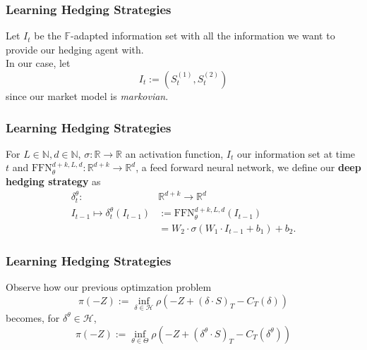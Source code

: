 \documentclass[serif]{beamer}
\def\R{{\mathbb R}}
\def\N{{\mathbb N}}
\def\F{{\mathbb F}}
\def\vs{{\vspace{0.5cm}}}
\def\H{{\mathcal H}}
\begin{document}
\begin{frame}
    \frametitle{Learning Hedging Strategies}
    \begin{definition}
        Let $I_t$ be the $\F$-adapted information
        set with all the information we want to provide our
        hedging agent with. \\ \vs
        In our case, let
        \[
            I_t := (S^{(1)}_t, S^{(2)}_t)
        \]
        since our market model is \emph{markovian}.
    \end{definition}
\end{frame}

\begin{frame}
    \frametitle{Learning Hedging Strategies}
    \begin{definition}
        For $L \in \N, d \in \N$, $\sigma: \R \to \R$
        an activation function,
        $I_t$ our information set at time $t$ and
        $\text{FFN}_\theta^{d+k, L, d} : \R^{d+k} \to \R^d$,
        a feed forward neural network, we define
        our \textbf{deep hedging strategy} as
        \begin{align*}
            \delta^\theta_t:
            \;\; & \R^{d+k} \to \R^d                                   \\
            I_{t-1} \mapsto \delta^\theta_t (I_{t-1})
                 & := \text{FFN}_\theta^{d+k, L, d} (I_{t-1})          \\
                 & = W_2 \cdot \sigma (W_1 \cdot I_{t-1} + b_1) + b_2.
        \end{align*}
    \end{definition}
\end{frame}

\begin{frame}
    \frametitle{Learning Hedging Strategies}
    Observe how our previous optimzation problem
    \[
        \pi (-Z) := \inf_{\delta \in \H} \rho (
        -Z + (\delta \cdot S)_T - C_T (\delta)
        )
    \]
    becomes, for $\delta^\theta \in \H$,
    \[
        \pi (-Z) := \inf_{\theta \in \Theta} \rho (
        -Z + (\delta^\theta \cdot S)_T - C_T (\delta^\theta)
        )
    \]
\end{frame}
\end{document}
